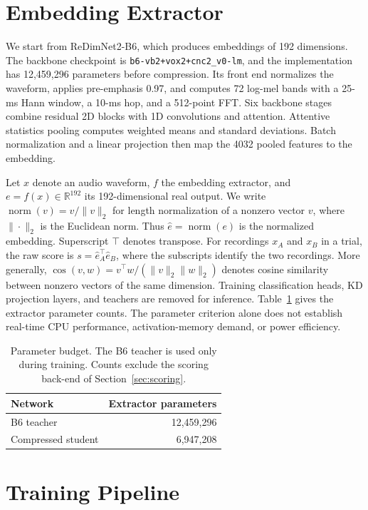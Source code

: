 \documentclass[11pt]{article}
\newcommand{\ltn}{\operatorname{norm}}
\begin{document}
\section{Embedding Extractor}
\label{sec:model}
We start from ReDimNet2-B6, which produces embeddings of 192 dimensions. The backbone checkpoint is \nolinkurl{b6-vb2+vox2+cnc2_v0-lm}, and the implementation has 12,459,296 parameters before compression. Its front end normalizes the waveform, applies pre-emphasis 0.97, and computes 72 log-mel bands with a 25-ms Hann window, a 10-ms hop, and a 512-point FFT. Six backbone stages combine residual 2D blocks with 1D convolutions and attention. Attentive statistics pooling computes weighted means and standard deviations. Batch normalization and a linear projection then map the 4032 pooled features to the embedding.

Let $x$ denote an audio waveform, $f$ the embedding extractor, and $e=f(x)\in\mathbb R^{192}$ its 192-dimensional real output. We write $\ltn(v)=v/\|v\|_2$ for length normalization of a nonzero vector $v$, where $\|\cdot\|_2$ is the Euclidean norm. Thus $\hat e=\ltn(e)$ is the normalized embedding. Superscript $\top$ denotes transpose. For recordings $x_A$ and $x_B$ in a trial, the raw score is $s=\hat e_A^\top\hat e_B$, where the subscripts identify the two recordings. More generally, $\cos(v,w)=v^\top w/(\|v\|_2\|w\|_2)$ denotes cosine similarity between nonzero vectors of the same dimension. Training classification heads, KD projection layers, and teachers are removed for inference. Table~\ref{tab:params} gives the extractor parameter counts. The parameter criterion alone does not establish real-time CPU performance, activation-memory demand, or power efficiency.

\begin{table}[t]
\centering
\begin{tabular}{lr}
\toprule
Network & Extractor parameters \\
\midrule
B6 teacher & 12,459,296 \\
Compressed student & 6,947,208 \\
\bottomrule
\end{tabular}
\caption{Parameter budget. The B6 teacher is used only during training. Counts exclude the scoring back-end of Section~\ref{sec:scoring}.}
\label{tab:params}
\end{table}

\section{Training Pipeline}
\label{sec:training}
\end{document}
